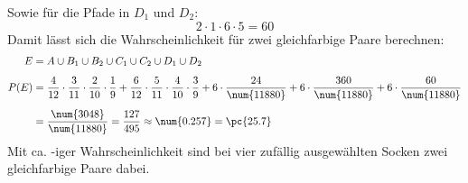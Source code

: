 \begin{exercise}
\begin{equation*}
    \end{equation*}
    Sowie für die Pfade in $D_1$ und $D_2$:
    \begin{equation*}
      2\cdot1\cdot6\cdot5=\num{60}
    \end{equation*}
    Damit lässt sich die Wahrscheinlichkeit für
    zwei gleichfarbige Paare berechnen:
    \begin{equation*}
      \begin{split}
        E&=A\cup B_1\cup B_2\cup C_1\cup C_2\cup D_1\cup D_2
        \\[1ex]
        P(E)&=\frac{4}{12}\cdot\frac{3}{11}\cdot\frac{2}{10}\cdot\frac{1}{9}
             +\frac{6}{12}\cdot\frac{5}{11}\cdot\frac{4}{10}\cdot\frac{3}{9}
             +6\cdot\frac{24}{\num{11880}}
             +6\cdot\frac{360}{\num{11880}}
             +6\cdot\frac{60}{\num{11880}}
        \\[1ex]
        &=\frac{\num{3048}}{\num{11880}}
        =\frac{127}{495}
        \approx\num{0.257}
        =\pc{25.7}
      \end{split}
    \end{equation*}
    Mit ca. -iger Wahrscheinlichkeit sind
    bei vier zufällig ausgewählten Socken zwei
    gleichfarbige Paare dabei.
  \fi
\end{exercise}
